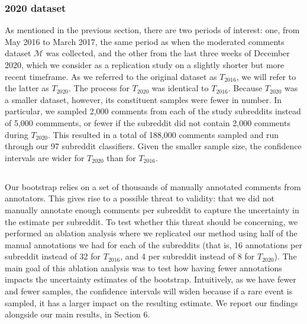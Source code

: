 \subsubsection{2020 dataset}
As mentioned in the previous section, there are two periods of interest: one, from May 2016 to March 2017, the same period as when the moderated comments dataset $\mathcal{M}$ was collected, and the other from the last three weeks of December 2020, which we consider as a replication study on a slightly shorter but more recent timeframe. As we referred to the original dataset as $T_{2016}$, we will refer to the latter as $T_{2020}$. The process for $T_{2020}$ was identical to $T_{2016}$. Because $T_{2020}$ was a smaller dataset, however, its constituent samples were fewer in number. In particular, we  sampled 2,000 comments from each of the study subreddits instead of 5,000 commments, or fewer if the subreddit did not contain 2,000 comments during $T_{2020}$. This resulted in a total of 188,000 comments sampled and run through our 97 subreddit classifiers. Given the smaller sample size, the confidence intervals are wider for $T_{2020}$ than for $T_{2016}$.

\subsection{}
Our bootstrap relies on a set of thousands of manually annotated comments from annotators. This gives rise to a possible threat to validity: that we did not manually annotate enough comments per subreddit to capture the uncertainty in the estimate per subreddit. To test whether this threat should be concerning, we performed an ablation analysis where we replicated our method using half of the manual annotations we had for each of the subreddits (that is, 16 annotations per subreddit instead of 32 for $T_{2016}$, and 4 per subreddit instead of 8 for $T_{2020}$). The main goal of this ablation analysis was to test how having fewer annotations impacts the uncertainty estimates of the bootstrap. Intuitively, as we have fewer and fewer samples, the confidence intervals will widen because if a rare event is sampled, it has a larger impact on the resulting estimate. We report our findings alongside our main results, in Section 6.
